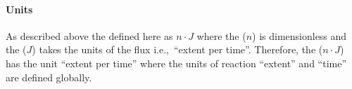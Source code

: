 \paragraph{Units}
As described above the \FluxObjective defined here as $n\cdot J$ where the  ($n$) is dimensionless and the  ($J$) takes the units of the  flux i.e.,~``extent per time''. Therefore, the \FluxObjective ($n\cdot J$)  has the unit ``extent per time'' where the units of reaction ``extent'' and ``time'' are defined globally.


